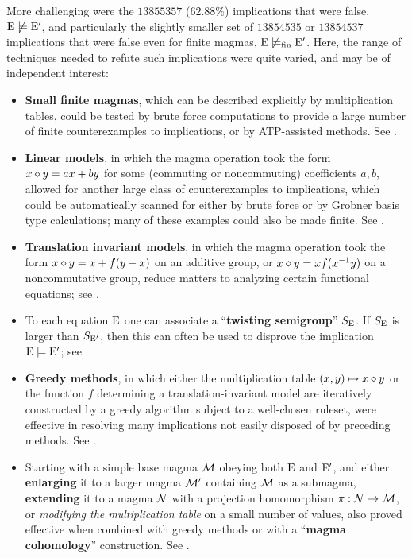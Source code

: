 More challenging were the $\num{13855357}$ ($62.88\%$) implications that were false, $\mathrm{E} \not\models {\mathrm{E}'}$, and particularly the slightly smaller set of $\num{13854535}$ or $\num{13854537}$ implications that were false even for finite magmas, $\mathrm{E} \not\models_{\mathrm{fin}} {\mathrm{E}'}$. Here, the range of techniques needed to refute such implications were quite varied, and may be of independent interest:
\begin{itemize}
        \item \textbf{Small finite magmas}, which can be described explicitly by multiplication tables, could be tested by brute force computations to provide a large number of finite counterexamples to implications, or by ATP-assisted methods. See .
        \item \textbf{Linear models}, in which the magma operation took the form $x \diamond y = ax + by$ for some (commuting or noncommuting) coefficients $a,b$, allowed for another large class of counterexamples to implications, which could be automatically scanned for either by brute force or by Grobner basis type calculations; many of these examples could also be made finite. See .
        \item \textbf{Translation invariant models}, in which the magma operation took the form $x \diamond y = x + f(y-x)$ on an additive group, or $x \diamond y = x f(x^{-1} y)$ on a noncommutative group, reduce matters to analyzing certain functional equations; see .
        \item To each equation $\mathrm{E}$ one can associate a ``\textbf{twisting semigroup}'' $S_{\mathrm{E}}$.  If $S_{\mathrm{E}}$ is larger than $S_{{\mathrm{E}'}}$, then this can often be used to disprove the implication ${\mathrm{E}} \models {\mathrm{E}'}$; see .
        \item \textbf{Greedy methods}, in which either the multiplication table $(x,y) \mapsto x \diamond y$ or the function $f$ determining a translation-invariant model are iteratively constructed by a greedy algorithm subject to a well-chosen ruleset, were effective in resolving many implications not easily disposed of by preceding methods. See .
        \item Starting with a simple base magma ${\mathcal{M}}$ obeying both $\mathrm{E}$ and ${\mathrm{E}'}$, and either \textbf{enlarging} it to a larger magma ${\mathcal{M}}'$ containing ${\mathcal{M}}$ as a submagma, \textbf{extending} it to a magma ${\mathcal{N}}$ with a projection homomorphism $\pi: {\mathcal{N}} \to {\mathcal{M}}$, or \emph{modifying the multiplication table} on a small number of values, also proved effective when combined with greedy methods or with a ``\textbf{magma cohomology}'' construction. See .

\end{itemize}
